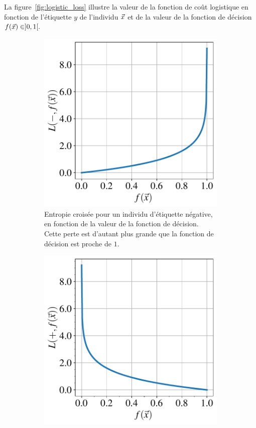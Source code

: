 La figure~\ref{fig:logistic_loss} illustre la valeur de la fonction de coût
logistique en fonction de l'étiquette $y$ de l'individu $\xx$ et de la valeur
de la fonction de décision $f(\xx) \in ]0, 1[.$ 

\begin{figure}[h]
  \centering
  \begin{subfigure}[t]{0.43\textwidth}
    \centering
    \includegraphics[width=\textwidth]{figures/erm/logistic_loss_neg}
    \caption{Entropie croisée pour un individu d'étiquette négative, en
      fonction de la valeur de la fonction de décision. Cette perte est
      d'autant plus grande que la fonction de décision est proche de $1$.}
    \label{fig:logistic_loss_neg}
  \end{subfigure} \hfill
  \begin{subfigure}[t]{0.43\textwidth}
    \includegraphics[width=\textwidth]{figures/erm/logistic_loss_pos}  

\end{subfigure}
\end{figure}
